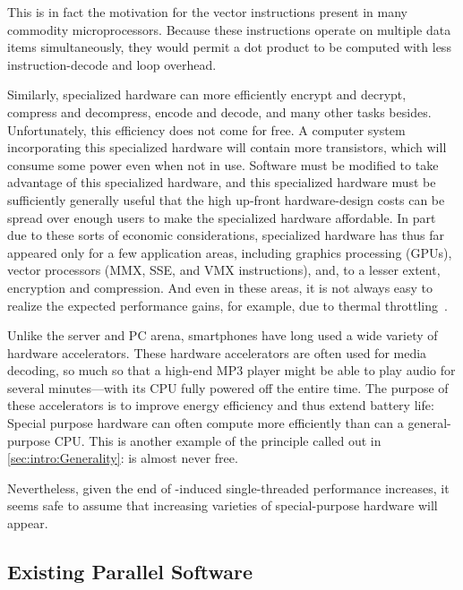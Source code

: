 This is in fact the motivation for the vector instructions present in
many commodity microprocessors.
Because these instructions operate on multiple data items simultaneously,
they would permit a dot product to be computed with less instruction-decode
and loop overhead.

Similarly, specialized hardware can more efficiently encrypt and decrypt,
compress and decompress, encode and decode, and many other tasks besides.
Unfortunately, this efficiency does not come for free.
A computer system incorporating this specialized hardware will contain
more transistors, which will consume some power even when not in use.
Software must be modified to take advantage of this specialized hardware,
and this specialized hardware must be sufficiently generally useful
that the high up-front hardware-design costs can be spread over enough
users to make the specialized hardware affordable.
In part due to these sorts of economic considerations, specialized
hardware has thus far appeared only for a few application areas,
including graphics processing (GPUs), vector processors (MMX, SSE,
and VMX instructions), and, to a lesser extent, encryption and
compression.
And even in these areas, it is not always easy to realize the expected
performance gains, for example, due to thermal
throttling~\cite{VladKrasnov2017SIMDfreqscale,DanielLemire2018SIMDfreqscale,TravisDowns2020SIMDfreqscale}.

Unlike the server and PC arena, smartphones have long used a wide
variety of hardware accelerators.
These hardware accelerators are often used for media decoding,
so much so that a high-end MP3 player might be able to play audio
for several minutes---with its CPU fully powered off the entire time.
The purpose of these accelerators is to improve energy efficiency
and thus extend battery life:
Special purpose hardware can often compute more efficiently than
can a general-purpose CPU\@.
This is another example of the principle called out in
\cref{sec:intro:Generality}:
 is almost never free.

Nevertheless, given the end of -induced
single-threaded performance increases, it seems safe to assume that
increasing varieties of special-purpose hardware will appear.

\subsection{Existing Parallel Software}
\label{sec:cpu:Existing Parallel Software}

